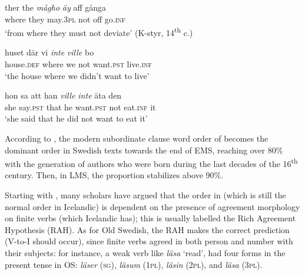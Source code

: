 \documentclass[output=paper]{langscibook}
\begin{document}
\ea\label{ex:intro:5}
\ea\label{ex:intro:5a}
\gll  ther     the \textit{mågho} \textit{äy} aff   gånga                \\
where   they   may.3\textsc{pl}   not   off   go\textsc{.inf}\\
\glt ‘from where they must not deviate’ (K-styr, 14\textsuperscript{th} c.)


\ex\label{ex:intro:5b}
\gll  huset       där     vi \textit{inte} \textit{ville} {bo}\\
        house.\textsc{def}     where   we     not   want.\textsc{pst}  live.\textsc{inf}\\
\glt        ‘the house where we didn’t want to live’


\ex\label{ex:intro:5c}
\gll  hon   sa   att   han   \textit{ville}       \textit{inte}   äta     den    \\
        she         say.\textsc{pst} that he   want.\textsc{pst}  not   eat.\textsc{inf}  it\\
\glt         ‘she said that he did not want to eat it’
\z
\z

According to \citet[176]{Falk1993}, the modern subordinate clause word order of  becomes the dominant order in Swedish texts towards the end of EMS, reaching over 80\% with the generation of authors who were born during the last decades of the 16\textsuperscript{th} century. Then, in LMS, the proportion stabilizes above 90\%.



Starting with \citet{Kosmeijer1986}, many scholars have argued that the order in  (which is still the normal order in Icelandic) is dependent on the presence of agreement morphology on finite verbs (which Icelandic has); this is usually labelled the Rich Agreement Hypothesis (RAH). As for Old Swedish, the RAH makes the correct prediction (V-to-I should occur), since finite verbs agreed in both person and number with their subjects: for instance, a weak verb like \textit{läsa} ‘read’, had four forms in the present tense in OS: \textit{läser} (\textsc{sg}), \textit{läsum} (1\textsc{pl}), \textit{läsin} (2\textsc{pl}), and \textit{läsa} (3\textsc{pl}).
\end{document}
